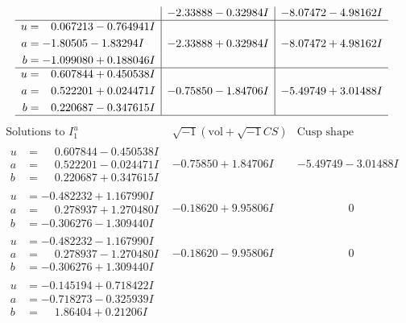 \documentclass[1p]{elsarticle_modified}
\theoremstyle{definition}
\newcommand{\I}{\sqrt{-1}}
\begin{document}
$$\begin{array}{c|c|c}
 & -2.33888 - 0.32984 I & -8.07472 - 4.98162 I \\ \hline\begin{aligned}
u &= \phantom{-}0.067213 - 0.764941 I \\
a &= -1.80505 - 1.83294 I \\
b &= -1.099080 + 0.188046 I\end{aligned}
 & -2.33888 + 0.32984 I & -8.07472 + 4.98162 I \\ \hline\begin{aligned}
u &= \phantom{-}0.607844 + 0.450538 I \\
a &= \phantom{-}0.522201 + 0.024471 I \\
b &= \phantom{-}0.220687 - 0.347615 I\end{aligned}
 & -0.75850 - 1.84706 I & -5.49749 + 3.01488 I\\
 \hline 
 \end{array}$$\newpage$$\begin{array}{c|c|c}  
\text{Solutions to }I^u_{1}& \I (\text{vol} + \sqrt{-1}CS) & \text{Cusp shape}\\
 \hline 
\begin{aligned}
u &= \phantom{-}0.607844 - 0.450538 I \\
a &= \phantom{-}0.522201 - 0.024471 I \\
b &= \phantom{-}0.220687 + 0.347615 I\end{aligned}
 & -0.75850 + 1.84706 I & -5.49749 - 3.01488 I \\ \hline\begin{aligned}
u &= -0.482232 + 1.167990 I \\
a &= \phantom{-}0.278937 + 1.270480 I \\
b &= -0.306276 - 1.309440 I\end{aligned}
 & -0.18620 + 9.95806 I & \phantom{-0.000000 } 0 \\ \hline\begin{aligned}
u &= -0.482232 - 1.167990 I \\
a &= \phantom{-}0.278937 - 1.270480 I \\
b &= -0.306276 + 1.309440 I\end{aligned}
 & -0.18620 - 9.95806 I & \phantom{-0.000000 } 0 \\ \hline\begin{aligned}
u &= -0.145194 + 0.718422 I \\
a &= -0.718273 - 0.325939 I \\
b &= \phantom{-}1.86404 + 0.21206 I\end{aligned}

\end{array}$$
\end{document}
